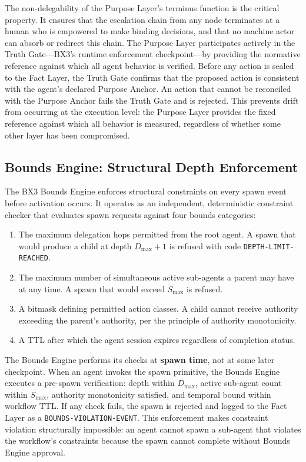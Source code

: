 The non-delegability of the Purpose Layer's terminus function is the critical property. It ensures that the escalation chain from any node terminates at a human who is empowered to make binding decisions, and that no machine actor can absorb or redirect this chain. The Purpose Layer participates actively in the Truth Gate---BX3's runtime enforcement checkpoint---by providing the normative reference against which all agent behavior is verified. Before any action is sealed to the Fact Layer, the Truth Gate confirms that the proposed action is consistent with the agent's declared Purpose Anchor. An action that cannot be reconciled with the Purpose Anchor fails the Truth Gate and is rejected. This prevents drift from occurring at the execution level: the Purpose Layer provides the fixed reference against which all behavior is measured, regardless of whether some other layer has been compromised.

\subsection{Bounds Engine: Structural Depth Enforcement}

The BX3 Bounds Engine enforces structural constraints on every spawn event before activation occurs. It operates as an independent, deterministic constraint checker that evaluates spawn requests against four bounds categories:

\begin{enumerate}
  \item[\textbf{Depth Bound ($D_{\max}$):}] The maximum delegation hops permitted from the root agent. A spawn that would produce a child at depth $D_{\max} + 1$ is refused with code \texttt{DEPTH-LIMIT-REACHED}.
  \item[\textbf{Scope Bound ($S_{\max}$):}] The maximum number of simultaneous active sub-agents a parent may have at any time. A spawn that would exceed $S_{\max}$ is refused.
  \item[\textbf{Authority Bound:}] A bitmask defining permitted action classes. A child cannot receive authority exceeding the parent's authority, per the principle of authority monotonicity.
  \item[\textbf{Temporal Bound ($T_{\text{bounds}}$):}] A TTL after which the agent session expires regardless of completion status.
\end{enumerate}

The Bounds Engine performs its checks at \textbf{spawn time}, not at some later checkpoint. When an agent invokes the spawn primitive, the Bounds Engine executes a pre-spawn verification: depth within $D_{\max}$, active sub-agent count within $S_{\max}$, authority monotonicity satisfied, and temporal bound within workflow TTL. If any check fails, the spawn is rejected and logged to the Fact Layer as a \texttt{BOUNDS-VIOLATION-EVENT}. This enforcement makes constraint violation structurally impossible: an agent cannot spawn a sub-agent that violates the workflow's constraints because the spawn cannot complete without Bounds Engine approval.

